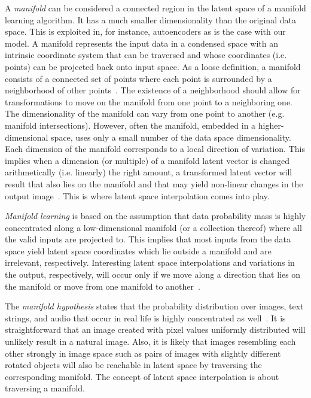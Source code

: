 \documentclass[12pt,a4paper]{article}
\begin{document}
A \textit{manifold} can be considered a connected region in the latent space of a manifold learning algorithm. It has a much smaller dimensionality than the original data space. This is exploited in, for instance, autoencoders as is the case with our model. A manifold represents the input data in a condensed space with an intrinsic coordinate system that can be traversed and whose coordinates (i.e. points) can be projected back onto input space. As a loose definition, a manifold consists of a connected set of points where each point is surrounded by a neighborhood of other points~\cite{DeepLearningBook}. The existence of a neighborhood should allow for transformations to move on the manifold from one point to a neighboring one. The dimensionality of the manifold can vary from one point to another (e.g. manifold intersections). However, often the manifold, embedded in a higher-dimensional space, uses only a small number of the data space dimensionality. Each dimension of the manifold corresponds to a local direction of variation. This implies when a dimension (or multiple) of a manifold latent vector is changed arithmetically (i.e. linearly) the right amount, a transformed latent vector will result that also lies on the manifold and that may yield non-linear changes in the output image~\cite{StyleGAN}. This is where latent space interpolation comes into play. 

\textit{Manifold learning} is based on the assumption that data probability mass is highly concentrated along a low-dimensional manifold (or a collection thereof) where all the valid inputs are projected to. This implies that most inputs from the data space yield latent space coordinates which lie outside a manifold and are irrelevant, respectively. Interesting latent space interpolations and variations in the output, respectively, will occur only if we move along a direction that lies on the manifold or move from one manifold to another~\cite{DeepLearningBook}.

The \textit{manifold hypothesis} states that the probability distribution over images, text strings, and audio that occur in real life is highly concentrated as well~\cite{ReprLearning}. It is straightforward that an image created with pixel values uniformly distributed will unlikely result in a natural image. Also, it is likely that images resembling each other strongly in image space such as pairs of images with slightly different rotated objects will also be reachable in latent space by traversing the corresponding manifold. The concept of latent space interpolation is about traversing a manifold.
\end{document}
